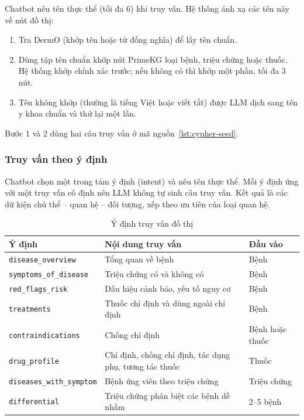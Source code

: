 Chatbot nêu tên thực thể (tối đa 6) khi truy vấn. Hệ thống ánh xạ các tên này về nút đồ thị:
\begin{enumerate}
  \item Tra DermO (khớp tên hoặc từ đồng nghĩa) để lấy tên chuẩn.
  \item Dùng tập tên chuẩn khớp nút PrimeKG loại bệnh, triệu chứng hoặc thuốc. Hệ thống khớp chính xác trước; nếu không có thì khớp một phần, tối đa 3 nút.
  \item Tên không khớp (thường là tiếng Việt hoặc viết tắt) được LLM dịch sang tên y khoa chuẩn và thử lại một lần.
\end{enumerate}

Bước 1 và 2 dùng hai câu truy vấn ở mã nguồn~\ref{lst:cypher-seed}.



\subsubsection{Truy vấn theo ý định}

Chatbot chọn một trong tám ý định (intent) và nêu tên thực thể. Mỗi ý định ứng với một truy vấn cố định nên LLM không tự sinh câu truy vấn. Kết quả là các dữ kiện chủ thể -- quan hệ -- đối tượng, xếp theo ưu tiên của loại quan hệ.

\begin{table}[H]
\centering
\caption{Ý định truy vấn đồ thị}
\label{tab:y-dinh-kg}
\small
\begin{tabular}{|p{4.6cm}|p{5.6cm}|p{3.6cm}|}
\hline
\textbf{Ý định} & \textbf{Nội dung truy vấn} & \textbf{Đầu vào} \\ \hline
\texttt{disease\_overview} & Tổng quan về bệnh & Bệnh \\ \hline
\texttt{symptoms\_of\_disease} & Triệu chứng có và không có & Bệnh \\ \hline
\texttt{red\_flags\_risk} & Dấu hiệu cảnh báo, yếu tố nguy cơ & Bệnh \\ \hline
\texttt{treatments} & Thuốc chỉ định và dùng ngoài chỉ định & Bệnh \\ \hline
\texttt{contraindications} & Chống chỉ định & Bệnh hoặc thuốc \\ \hline
\texttt{drug\_profile} & Chỉ định, chống chỉ định, tác dụng phụ, tương tác thuốc & Thuốc \\ \hline
\texttt{diseases\_with\_symptom} & Bệnh ứng viên theo triệu chứng & Triệu chứng \\ \hline
\texttt{differential} & Triệu chứng phân biệt các bệnh dễ nhầm & 2--5 bệnh \\ \hline
\end{tabular}
\end{table}

